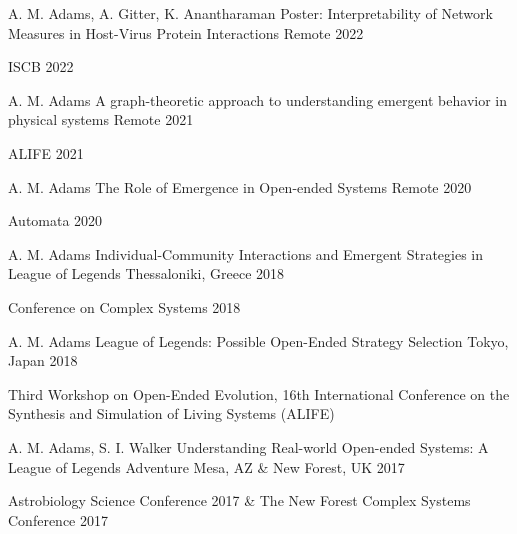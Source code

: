 \begin{cventries}
\cventry
    {\textcolor{cmyk-magenta}{A. M. Adams}, A. Gitter, K. Anantharaman}
    {Poster: Interpretability of Network Measures in Host-Virus Protein Interactions}
    {Remote}
    {2022}
    {
      \begin{cvitems}
        \item {ISCB 2022}
      \end{cvitems}
    }
    
\cventry
    {\textcolor{cmyk-magenta}{A. M. Adams}}
    {A graph-theoretic approach to understanding emergent behavior in physical systems}
    {Remote}
    {2021}
    {
      \begin{cvitems}
        \item {ALIFE 2021}
      \end{cvitems}
    }
    
\cventry
    {\textcolor{cmyk-magenta}{A. M. Adams}}
    {The Role of Emergence in Open-ended Systems}
    {Remote}
    {2020}
    {
      \begin{cvitems}
        \item {Automata 2020}
      \end{cvitems}
    }
    
\cventry
    {\textcolor{cmyk-magenta}{A. M. Adams}}
    {Individual-Community Interactions and Emergent Strategies in League of Legends}
    {Thessaloniki, Greece}
    {2018}
    {
      \begin{cvitems}
        \item {Conference on Complex Systems 2018}
      \end{cvitems}
    }
    
\cventry
    {\textcolor{cmyk-magenta}{A. M. Adams}}
    {League of Legends: Possible Open-Ended Strategy Selection}
    {Tokyo, Japan}
    {2018}
    {
      \begin{cvitems}
        \item {Third Workshop on Open-Ended Evolution, 16th International Conference on the Synthesis and Simulation of Living Systems (ALIFE)}
      \end{cvitems}
    }
    
\cventry
    {\textcolor{cmyk-magenta}{A. M. Adams}, S. I. Walker}
    {Understanding Real-world Open-ended Systems: A League of Legends Adventure}
    {Mesa, AZ \& New Forest, UK}
    {2017}
    {
      \begin{cvitems}
        \item {Astrobiology Science Conference 2017 \& The New Forest Complex Systems Conference 2017}
      \end{cvitems}
    }
    

\end{cventries}
